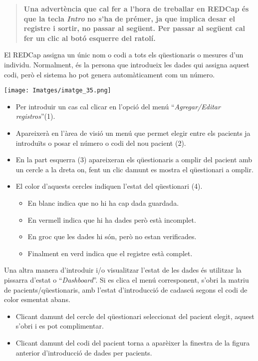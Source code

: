 \documentclass[
]{article}
\providecommand{\tightlist}{%
  \setlength{\itemsep}{0pt}\setlength{\parskip}{0pt}}
\begin{document}
\begin{quote}
\textbf{Una advertència que cal fer a l'hora de treballar en REDCap és que la tecla \emph{Intro} no s'ha de prémer, ja que implica desar el registre i sortir, no passar al següent. Per passar al següent cal fer un clic al botó esquerre del ratolí.}
\end{quote}

El REDCap assigna un únic nom o codi a tots els qüestionaris o mesures d'un individu. Normalment, és la persona que introdueix les dades qui assigna aquest codi, però el sistema ho pot genera automàticament com un número.

\texttt{[image: Imatges/imatge\_35.png]}

\begin{itemize}
\tightlist
\item
  Per introduir un cas cal clicar en l'opció del menú ``\emph{Agregar/Editar registros}''(1).
\item
  Apareixerà en l'àrea de visió un menú que permet elegir entre els pacients ja introduïts o posar el número o codi del nou pacient (2).
\item
  En la part esquerra (3) apareixeran els qüestionaris a omplir del pacient amb un cercle a la dreta on, fent un clic damunt es
  mostra el qüestionari a omplir.
\item
  El color d'aquests cercles indiquen l'estat del qüestionari (4).

  \begin{itemize}
  \tightlist
  \item
    En blanc indica que no hi ha cap dada guardada.
  \item
    En vermell indica que hi ha dades però està incomplet.
  \item
    En groc que les dades hi són, però no estan verificades.
  \item
    Finalment en verd indica que el registre està complet.
  \end{itemize}
\end{itemize}

Una altra manera d'introduir i/o visualitzar l'estat de les dades és utilitzar la pissarra d'estat o ``\emph{Dashboard}''. Si es clica el menú corresponent, s'obri la matriu de pacients/qüestionaris, amb l'estat d'introducció de cadascú segons el codi de color esmentat abans.

\begin{itemize}
\tightlist
\item
  Clicant damunt del cercle del qüestionari seleccionat del pacient elegit, aquest s'obri i es pot complimentar.
\item
  Clicant damunt del codi del pacient torna a aparèixer la finestra de la figura anterior d'introducció de dades per pacients.
\end{itemize}
\end{document}
